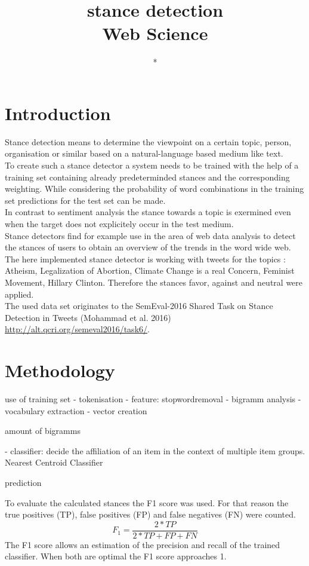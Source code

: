 \documentclass[a4paper,12pt,twoside]{article}
\title{stance detection\\ Web Science }
\author{*}
\begin{document}
\section{Introduction}
Stance detection means to determine the viewpoint on a certain topic, person, organisation or similar based on a natural-language based medium like text.\\ 
To create such a stance detector a system needs to be trained with the help of a training set containing already predeterminded stances and the corresponding weighting. While considering the probability of word combinations in the training set predictions for the test set can be made.\\
In contrast to sentiment analysis the stance towards a topic is exermined even when the target does not explicitely occur in the test medium. \\
Stance detectors find for example use in the area of web data analysis to detect the stances of users to obtain an overview of the trends in the word wide web. \\
The here implemented stance detector is working with tweets for the topics : Atheism, Legalization of Abortion, Climate Change is a real Concern, Feminist Movement, Hillary Clinton. Therefore the stances favor, against and neutral were applied.\\
The used data set originates to the SemEval-2016 Shared Task on Stance Detection in Tweets
(Mohammad et al. 2016) \url{http://alt.qcri.org/semeval2016/task6/}.



\section{Methodology}
use of training set
- tokenisation
- feature: stopwordremoval
- bigramm analysis
- vocabulary extraction
- vector creation

amount of bigramms

- classifier:
decide the affiliation of an item in the context of multiple item groups.
Nearest Centroid Classifier


prediction


To evaluate the calculated stances the F1 score was used. For that reason the true positives (TP), false positives (FP) and false negatives (FN) were counted.
\begin{equation}
F_1 = \frac{2*TP}{ 2*TP + FP + FN}
\end{equation}
The F1 score allows an estimation of the precision and recall of the trained classifier. When both are optimal the F1 score approaches 1.
\end{document}
